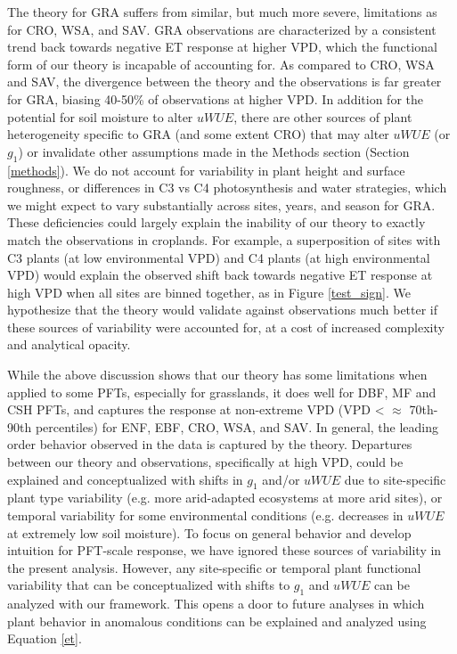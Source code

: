 \documentclass[draft,linenumbers]{agujournal}
\begin{document}
The theory for GRA suffers from similar, but much more severe,
limitations as for CRO, WSA, and SAV. GRA observations are
characterized by a consistent trend back towards negative ET response
at higher VPD, which the functional form of our theory is incapable of
accounting for. As compared to CRO, WSA and SAV, the divergence
between the theory and the observations is far greater for GRA,
biasing 40-50\% of observations at higher VPD. In addition for the
potential for soil moisture to alter $uWUE$, there are other sources
of plant heterogeneity specific to GRA (and some extent CRO) that may
alter $uWUE$ (or $g_1$) or invalidate other assumptions made in the
Methods section (Section \ref{methods}). We do not account for
variability in plant height and surface roughness, or differences in
C3 vs C4 photosynthesis and water strategies, which we might expect to
vary substantially across sites, years, and season for GRA. These
deficiencies could largely explain the inability of our theory to
exactly match the observations in croplands. For example, a
superposition of sites with C3 plants (at low environmental VPD) and
C4 plants (at high environmental VPD) would explain the observed shift
back towards negative ET response at high VPD when all sites are
binned together, as in Figure \ref{test_sign}. We hypothesize that the
theory would validate against observations much better if these
sources of variability were accounted for, at a cost of increased
complexity and analytical opacity. 


While the above discussion shows that our theory has some limitations
when applied to some PFTs, especially for grasslands, it does well for
DBF, MF and CSH PFTs, and captures the response at non-extreme VPD
(VPD < $\approx$ 70th-90th percentiles) for
ENF, EBF, CRO, WSA, and SAV. In general, the leading order behavior
observed in the data is captured by the theory. Departures between our
theory and observations, specifically at high VPD, could be explained
and conceptualized with shifts in $g_1$ and/or $uWUE$ due to
site-specific plant type variability (e.g. more arid-adapted ecosystems
at more arid sites), or temporal variability for some environmental
conditions (e.g. decreases in $uWUE$ at extremely low soil
moisture). To focus on general behavior and develop intuition for
PFT-scale response, we have ignored these sources of variability in
the present analysis. However, any site-specific or temporal plant
functional variability that can be conceptualized with shifts to $g_1$
and $uWUE$ can be analyzed with our framework. This opens a door to future analyses in which plant behavior in anomalous conditions
can be explained and analyzed using Equation \ref{et}.
\end{document}

